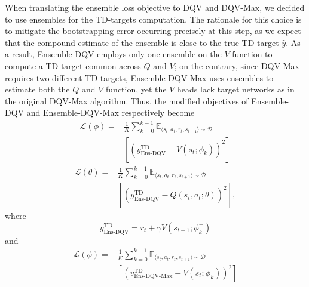 When translating the ensemble loss objective to DQV and DQV-Max, we
decided to use ensembles for the TD-targets computation. The rationale
for this choice is to mitigate the bootstrapping error occurring
precisely at this step, as we expect that the compound estimate of the
ensemble is close to the true TD-target $\hat{y}$. As a result,
Ensemble-DQV employs only one ensemble on the $V$ function to compute
a TD-target common across $Q$ and $V$; on the contrary, since DQV-Max
requires two different TD-targets, Ensemble-DQV-Max uses ensembles to
estimate both the $Q$ and $V$ function, yet the $V$ heads lack target
networks as in the original DQV-Max algorithm. Thus, the modified
objectives of Ensemble-DQV and Ensemble-DQV-Max respectively become
\begin{equation}
  \begin{aligned}
    \mathcal{L}\left(\phi\right)=&\frac{1}{K}\sum_{k=0}^{k-1}\mathbb{E}_{\langle
                                   s_t,a_t,r_t,s_{t+1}\rangle\sim\mathcal{D}}\\
                                 &\left[{\left(y^{\scriptscriptstyle\textrm{TD}}_{\scriptscriptstyle\textrm{Ens-DQV}}-V\left(s_t;\phi_{k}\right)\right)}^2\right]
  \end{aligned}
\end{equation}
\begin{equation}
  \begin{aligned}
    \mathcal{L}\left(\theta\right)=&\frac{1}{K}\sum_{k=0}^{k-1}\mathbb{E}_{\langle
                                     s_t,a_t,r_t,s_{t+1}\rangle\sim\mathcal{D}}\\
                                   &\left[{\left(y^{\scriptscriptstyle\textrm{TD}}_{\scriptscriptstyle\textrm{Ens-DQV}}-Q\left(s_t,a_t;\theta\right)\right)}^2\right],
  \end{aligned}
\end{equation}
where
\begin{equation}
  y^{\scriptscriptstyle\textrm{TD}}_{\scriptscriptstyle\textrm{Ens-DQV}}=r_t+\gamma
  V\left(s_{t+1};\phi_{k}^{-}\right)
\end{equation}
and
\begin{equation}
  \begin{aligned}
    \mathcal{L}\left(\phi\right)=&\frac{1}{K}\sum_{k=0}^{k-1}\mathbb{E}_{\langle
                                   s_t,a_t,r_t,s_{t+1}\rangle\sim\mathcal{D}}\\
                                 &\left[{\left(v^{\scriptscriptstyle\textrm{TD}}_{\scriptscriptstyle\textrm{Ens-DQV-Max}}-V\left(s_t;\phi_k\right)\right)}^2\right]
  \end{aligned}
\end{equation}
